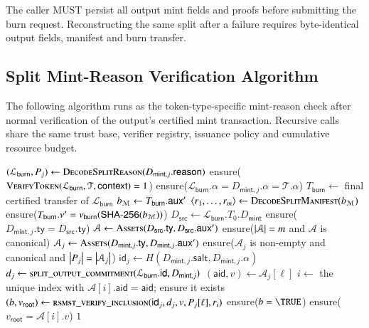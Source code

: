 The caller MUST persist all output mint fields and proofs before submitting the burn request. Reconstructing the same split after a failure requires byte-identical output fields, manifest and burn transfer.

\subsection{Split Mint-Reason Verification Algorithm}\label{app:split-verification-algorithm}

The following algorithm runs as the token-type-specific mint-reason check after normal verification of the output's certified mint transaction. Recursive calls share the same trust base, verifier registry, issuance policy and cumulative resource budget.

\begin{algorithm}[!htbp]
	\caption{Split Mint-Reason Verification}\label{alg:split-verify}
	\begin{algorithmic}[0]
			\State $(\mathcal{L}_\mathsf{burn},P_j)\gets\Call{DecodeSplitReason}{D_{\mathsf{mint},j}.\mathsf{reason}}$
			\State ensure($\Call{VerifyToken}{\mathcal{L}_\mathsf{burn},\mathcal{T},\mathsf{context}}=1$)
			\State ensure($\mathcal{L}_\mathsf{burn}.\alpha=D_{\mathsf{mint},j}.\alpha=\mathcal{T}.\alpha$)
			\State $T_\mathsf{burn}\gets$ final certified transfer of $\mathcal{L}_\mathsf{burn}$
			\State $b_\mathcal{M}\gets T_\mathsf{burn}.\mathsf{aux}'$
			\State $\langle r_1,\ldots,r_m\rangle\gets\Call{DecodeSplitManifest}{b_\mathcal{M}}$
			\State ensure($T_\mathsf{burn}.\nu'=\nu_\mathsf{burn}(\mathsf{SHA\text{-}256}(b_\mathcal{M}))$)
			\State $D_\mathsf{src}\gets\mathcal{L}_\mathsf{burn}.T_0.D_\mathsf{mint}$
			\State ensure($D_{\mathsf{mint},j}.\mathsf{ty}=D_\mathsf{src}.\mathsf{ty}$)
			\State $\mathcal{A}\gets\Call{Assets}{D_\mathsf{src}.\mathsf{ty},D_\mathsf{src}.\auxd'}$
			\State ensure($\left|\mathcal{A}\right|=m$ and $\mathcal{A}$ is canonical)
			\State $\mathcal{A}_j\gets\Call{Assets}{D_{\mathsf{mint},j}.\mathsf{ty},D_{\mathsf{mint},j}.\auxd'}$
			\State ensure($\mathcal{A}_j$ is non-empty and canonical and $\left|P_j\right|=\left|\mathcal{A}_j\right|$)
			\State $\mathsf{id}_j\gets H(D_{\mathsf{mint},j}.\mathsf{salt},D_{\mathsf{mint},j}.\alpha)$
			\State $d_j\gets\Call{split\_output\_commitment}{\mathcal{L}_\mathsf{burn}.\mathsf{id},D_{\mathsf{mint},j}}$
				\State $(\mathsf{aid},v)\gets\mathcal{A}_j[\ell]$
				\State $i\gets$ the unique index with $\mathcal{A}[i].\mathsf{aid}=\mathsf{aid}$; ensure it exists
				\State $(b,v_\mathsf{root})\gets\Call{rsmst\_verify\_inclusion}{\mathsf{id}_j,d_j,v,P_j[\ell],r_i}$
				\State ensure($b=\TRUE$)
				\State ensure($v_\mathsf{root}=\mathcal{A}[i].v$)
			\EndFor
			\State \Return $1$
		\EndFunction
	\end{algorithmic}
\end{algorithm}
